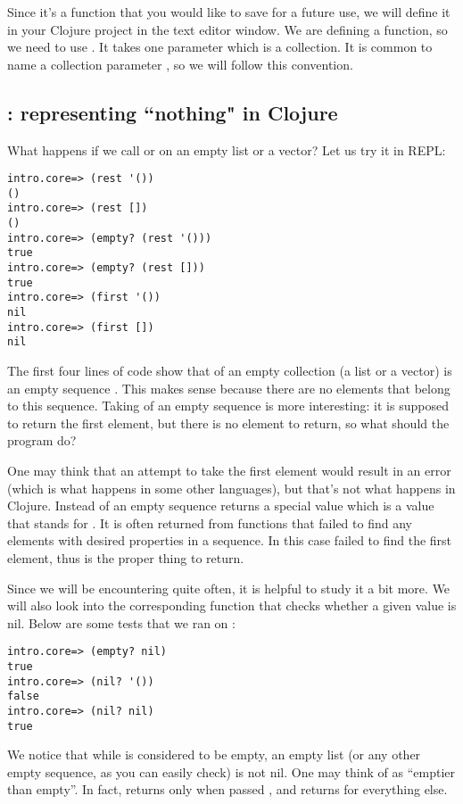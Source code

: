 Since it's a function that you would like to save for a future use, we will define it in your Clojure project in the text editor window.  
We are defining a function, so we need to use . It takes one parameter which is a collection. It is common to name a collection parameter , so we will follow this convention. 



\subsection{: representing ``nothing" in Clojure}\label{subsec:nil}
What happens if we call  or  on an empty list or a vector?  Let us try it in REPL:
\begin{framed}
\begin{verbatim}
intro.core=> (rest '())
()
intro.core=> (rest [])
()
intro.core=> (empty? (rest '()))
true
intro.core=> (empty? (rest []))
true
intro.core=> (first '())
nil
intro.core=> (first [])
nil
\end{verbatim}
\end{framed}
The first four lines of code show that  of an empty collection (a list or a vector) is an empty sequence \clocode{()}. This makes sense because there are no elements that belong to this sequence. Taking  of an empty sequence is more interesting: it is supposed to return the first element, but there is no element to return, so what should the program do? 

One may think that an attempt to take the first element would result in an error (which is what happens in some other languages), but that's not what happens in Clojure. Instead  of an empty sequence returns a special value  which is a value that stands for . It is often returned from functions that failed to find any elements with desired properties in a sequence. In this case  failed to find the first element, thus  is the proper thing to return. 

Since we will be encountering  quite often, it is helpful to study it a bit more. We will also look into the corresponding function  that checks whether a given value is nil. Below are some tests that we ran on  :
\begin{framed}
\begin{verbatim}
intro.core=> (empty? nil)
true
intro.core=> (nil? '())
false
intro.core=> (nil? nil)
true
\end{verbatim}
\end{framed}
We notice that while  is considered to be empty, an empty list (or any other empty sequence, as you can easily check) is not nil. One may think of   as ``emptier than empty''. In fact,  returns  only when passed , and returns  for everything else. 

